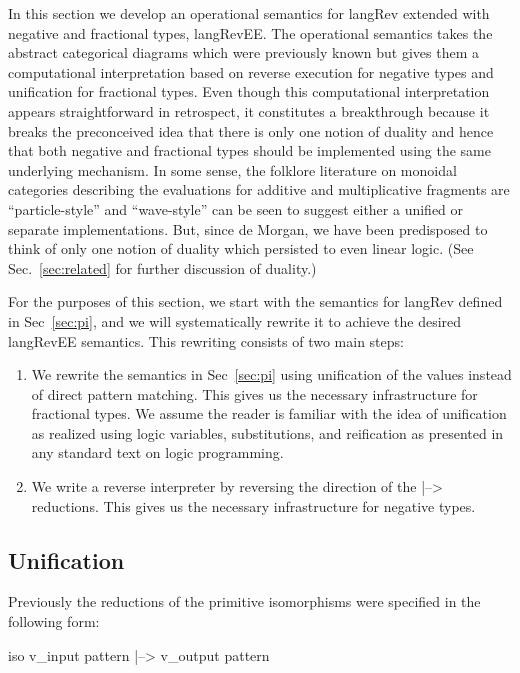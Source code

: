 \documentclass[preprint]{sigplanconf}
\begin{document}
In this section we develop an operational semantics for {{langRev}} extended
with negative and fractional types, {{langRevEE}}. The operational semantics
takes the abstract categorical diagrams which were previously known but gives
them a computational interpretation based on reverse execution for negative
types and unification for fractional types. Even though this computational
interpretation appears straightforward in retrospect, it constitutes a
breakthrough because it breaks the preconceived idea that there is only one
notion of duality and hence that both negative and fractional types should be
implemented using the same underlying mechanism. In some sense, the folklore
literature on monoidal categories describing the evaluations for additive and
multiplicative fragments are ``particle-style'' and ``wave-style'' can be
seen to suggest either a unified or separate implementations. But, since de
Morgan, we have been predisposed to think of only one notion of duality which
persisted to even linear logic. (See Sec.~\ref{sec:related} for further
discussion of duality.)

For the purposes of this section, we start with the semantics for {{langRev}}
defined in Sec~\ref{sec:pi}, and we will systematically rewrite it to achieve
the desired {{langRevEE}} semantics. This rewriting consists of two main steps:

\begin{enumerate}
\item We rewrite the semantics in Sec~\ref{sec:pi} using unification of the
  values instead of direct pattern matching. This gives us the necessary
  infrastructure for fractional types. We assume the reader is familiar with
  the idea of unification as realized using logic variables, substitutions,
  and reification as presented in any standard text on logic programming.
\item We write a reverse interpreter by reversing the direction of the
  {{|-->}} reductions. This gives us the necessary infrastructure for
  negative types.
\end{enumerate}

\subsection{Unification} 

Previously the reductions of the primitive isomorphisms were specified in the
following form:

{{ iso v_{input pattern} |--> v_{output pattern} }}
\end{document}
